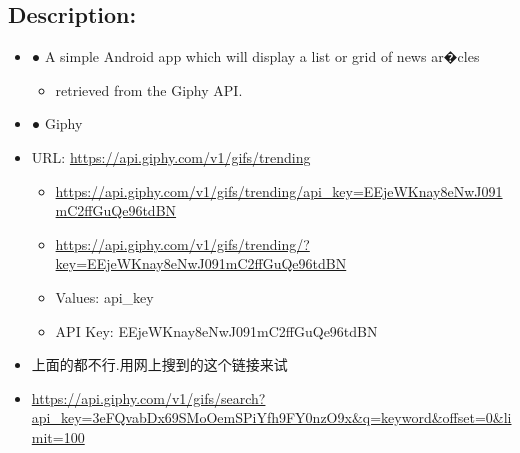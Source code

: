 \documentclass[9pt, b5paper]{article}
\begin{document}
\subsection{Description:}
\label{sec-2-1}
\begin{itemize}
\item ● A simple Android app which will display a list or grid of news ar�cles
\begin{itemize}
\item retrieved from the Giphy API.
\end{itemize}
\item ● Giphy
\item URL: \url{https://api.giphy.com/v1/gifs/trending}
\begin{itemize}
\item \url{https://api.giphy.com/v1/gifs/trending/api_key=EEjeWKnay8eNwJ091mC2ffGuQe96tdBN}
\item \url{https://api.giphy.com/v1/gifs/trending/?key=EEjeWKnay8eNwJ091mC2ffGuQe96tdBN}
\item Values: api\_key
\item API Key: EEjeWKnay8eNwJ091mC2ffGuQe96tdBN
\end{itemize}
\item 上面的都不行.用网上搜到的这个链接来试
\item \url{https://api.giphy.com/v1/gifs/search?api_key=3eFQvabDx69SMoOemSPiYfh9FY0nzO9x&q=keyword&offset=0&limit=100}
\end{itemize}
\end{document}
